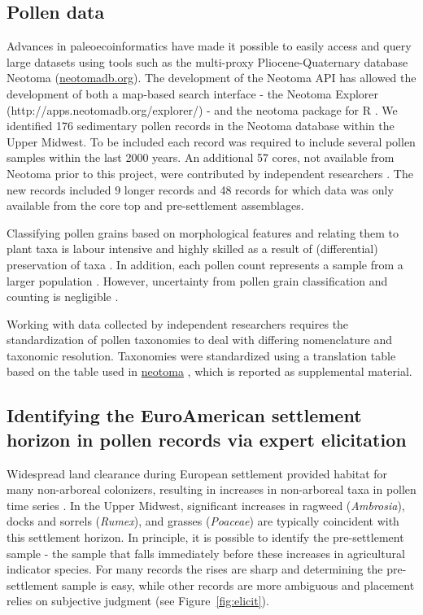 \documentclass[12pt]{article}
\begin{document}
\subsection{Pollen data}

Advances in paleoecoinformatics have made it possible to easily access
and query large datasets using tools such as the multi-proxy
Pliocene-Quaternary database Neotoma (\url{neotomadb.org}). The
development of the Neotoma API has allowed the development of both a
map-based search interface - the Neotoma Explorer
(http://apps.neotomadb.org/explorer/) - and the neotoma package for R
\citep{goring2015}. We identified 176 sedimentary pollen records in
the Neotoma database within the Upper Midwest. To be included each
record was required to include several pollen samples within the last
2000 years.  An additional 57 cores, not available from Neotoma prior
to this project, were contributed by independent researchers
\citep{kujawa2015}. The new records included 9 longer records and 48
records for which data was only available from the core top and
pre-settlement assemblages.

Classifying pollen grains based on morphological features and relating
them to plant taxa is labour intensive and highly skilled as a result
of (differential) preservation of taxa \citep{havinga1964,
  havinga1984}. In addition, each pollen count represents a sample
from a larger population \citep{maher2012assessment,
  maher1981statistics}. However, uncertainty from pollen grain
classification and counting is negligible \citep{webb1978sensing,
  webb1978mapped}. 

Working with data collected by independent researchers requires the
standardization of pollen taxonomies to deal with differing
nomenclature and taxonomic resolution. Taxonomies were standardized
using a translation table based on the table used in \url{neotoma}
\citep{goring}, which is reported as supplemental material.

\subsection{Identifying the EuroAmerican settlement horizon in pollen records via expert elicitation}
Widespread land clearance during European settlement provided habitat
for many non-arboreal colonizers, resulting in increases in
non-arboreal taxa in pollen time series \citep{mcandrews1988human}. In
the Upper Midwest, significant increases in ragweed
(\textit{Ambrosia}), docks and sorrels (\textit{Rumex}), and grasses
(\textit{Poaceae}) are typically coincident with this settlement
horizon. In principle, it is possible to identify the pre-settlement
sample - the sample that falls immediately before these increases in
agricultural indicator species. For many records the rises are sharp
and determining the pre-settlement sample is easy, while other records
are more ambiguous and placement relies on subjective judgment (see
Figure~\ref{fig:elicit}).
\end{document}
